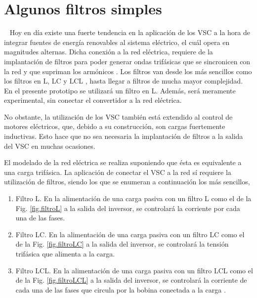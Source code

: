 \documentclass{report}
\begin{document}
\clearpage
\section{Algunos filtros simples} \label{sec.tiposdefiltros}
Hoy en día existe una fuerte tendencia en la aplicación de los VSC a la hora de integrar fuentes de energía renovables al sistema eléctrico, el cuál opera en magnitudes alternas. Dicha conexión a la red eléctrica, requiere de la implantación de filtros para poder generar ondas trifásicas que se sincronicen con la red y que supriman los armónicos \cite{treintaycuatro}. Los filtros van desde los más sencillos como los filtros en L, LC y LCL \cite{treintaycinco,treintaysiete,treintayocho}, hasta llegar a filtros de mucha mayor complejidad. En el presente prototipo se utilizará un filtro en L. Además, será meramente experimental, sin conectar el convertidor a la red eléctrica.

No obstante, la utilización de los VSC también está extendido al control de motores eléctricos, que, debido a su construcción, son cargas fuertemente inductivas. Esto hace que no sea necesaria la implantación de filtros a la salida del VSC en muchas ocasiones.

 El modelado de la red eléctrica se realiza suponiendo que ésta es equivalente a una carga trifásica. La aplicación de conectar el VSC a la red sí requiere la utilización de filtros, siendo los que se enumeran a continuación los más sencillos,

\begin{enumerate}
    \item Filtro L. En la alimentación de una carga pasiva con un filtro L como el de la Fig. \ref{fig.filtroL} a la salida del inversor, se controlará la corriente por cada una de las fases.
    
    \item Filtro LC. En la alimentación de una carga pasiva con un filtro LC como el de la Fig. \ref{fig.filtroLC}  a la salida del inversor, se controlará la tensión trifásica que alimenta a la carga.

    
    \item Filtro LCL. En la alimentación de una carga pasiva con un filtro LCL como el de la Fig. \ref{fig.filtroLCL} a la salida del inversor, se controlará la corriente de cada una de las fases que circula por la bobina conectada a la carga \cite{treintaytres, cuarentaycinco}.
    

    \end{enumerate}
    
\end{document}
